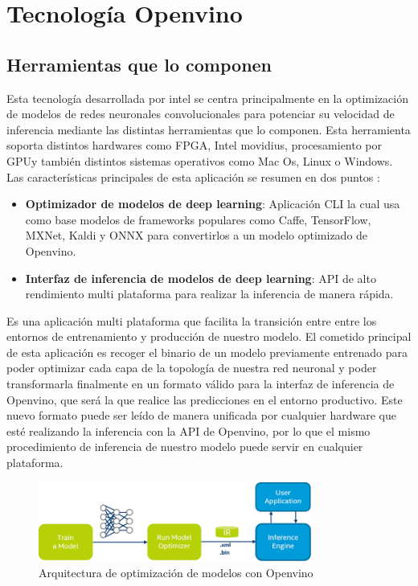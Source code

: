 \cleardoublepage
\mbox{}


\chapter{Tecnología Openvino}
\label{ch:chapter3}


\section{Herramientas que lo componen}
Esta tecnología desarrollada por intel se centra principalmente en la optimización de modelos de redes neuronales convolucionales para potenciar su velocidad de inferencia mediante las distintas herramientas que lo componen.
Esta herramienta soporta distintos hardwares como FPGA, Intel movidius, procesamiento por GPU\@ y también distintos sistemas operativos como Mac Os, Linux o Windows.
Las características principales de esta aplicación se resumen en dos puntos :
\begin{itemize}
    \item \textbf{Optimizador de modelos de deep learning}: Aplicación CLI la cual usa como base modelos de frameworks populares como Caffe, TensorFlow, MXNet, Kaldi y ONNX para convertirlos a un modelo optimizado de Openvino.
    \item \textbf{Interfaz de inferencia de modelos de deep learning}: API de alto rendimiento multi plataforma para realizar la inferencia de manera rápida.
\end{itemize}

Es una aplicación multi plataforma que facilita la transición entre entre los entornos de entrenamiento y producción de nuestro modelo.
El cometido principal de esta aplicación es recoger el binario de un modelo previamente entrenado para poder optimizar cada capa de la topología de nuestra red neuronal y
poder transformarla finalmente en un formato válido para la interfaz de inferencia de Openvino, que será la que realice las predicciones en el entorno productivo.
Este nuevo formato puede ser leído de manera unificada por cualquier hardware que esté realizando la inferencia con la API de Openvino, por lo que el mismo procedimiento de inferencia de nuestro modelo
puede servir en cualquier plataforma.

\begin{figure}
    \centering
    \includegraphics[width=0.8\textwidth]{images/openvino/model_optimizer.png}
    \caption{Arquitectura de optimización de modelos con Openvino}
    \label{fig:Arquitectura de optimización de modelos con Openvino}
\end{figure}

